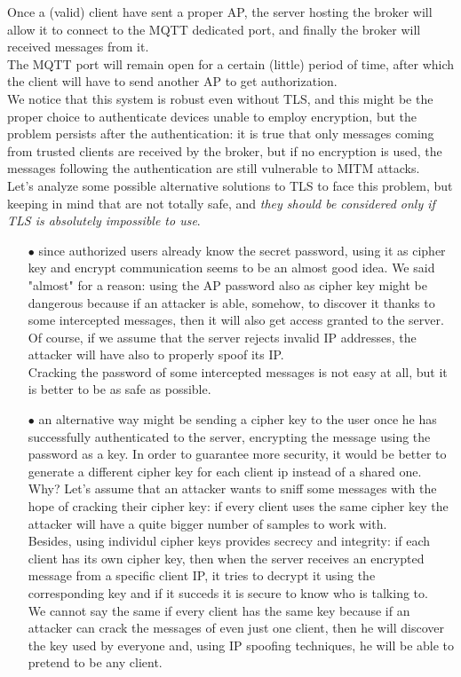 \documentclass[12pt]{report}
\begin{document}
{Once a (valid) client have sent a proper AP, the server hosting the broker will allow it to connect to the MQTT dedicated port, and finally the broker will received messages from it.\\
The MQTT port will remain open for a certain (little) period of time, after which the client will have to send another AP to get authorization.\\

We notice that this system is robust even without TLS, and this might be the proper choice to authenticate devices unable to employ encryption, but the problem persists after the authentication: it is true that only messages coming from trusted clients are received by the broker, but if no encryption is used, the messages following the authentication are still vulnerable to MITM attacks.\\

Let's analyze some possible alternative solutions to TLS to face this problem, but keeping in mind that are not totally safe, and \emph{they should be considered only if TLS is absolutely impossible to use}.

\begin{itemize}
\setlength{\itemindent}{+4mm}
\item[$\bullet$] since authorized users already know the secret password, using it as cipher key and encrypt communication seems to be an almost good idea. We said "almost" for a reason: using the AP password also as cipher key might be dangerous because if an attacker is able, somehow, to discover it thanks to some intercepted messages, then it will also get access granted to the server.\\
Of course, if we assume that the server rejects invalid IP addresses, the attacker will have also to properly spoof its IP.\\
Cracking the password of some intercepted messages is not easy at all, but it is better to be as safe as possible.
\item[$\bullet$] an alternative way might be sending a cipher key to the user once he has successfully authenticated to the server, encrypting the message using the password as a key. In order to guarantee more security, it would be better to generate a different cipher key for each client ip instead of a shared one. Why?
Let's assume that an attacker wants to sniff some messages with the hope of cracking their cipher key: if every client uses the same cipher key the attacker will have a quite bigger number of samples to work with.\\
Besides, using individul cipher keys provides secrecy and integrity: if each client has its own cipher key, then when the server receives an encrypted message from a specific client IP, it tries to decrypt it using the corresponding key and if it succeds it is secure to know who is talking to.\\
We cannot say the same if every client has the same key because if an attacker can crack the messages of even just one client, then he will discover the key used by everyone and, using IP spoofing techniques, he will be able to pretend to be any client.\\


\end{itemize}}
\end{document}
